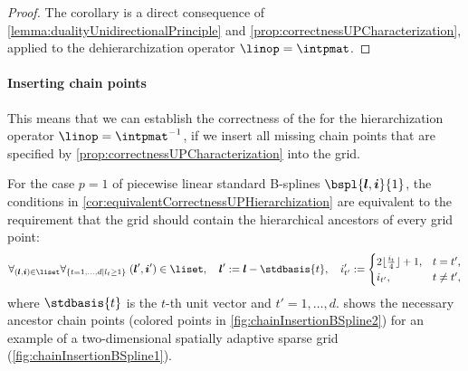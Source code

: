 \begin{proof}
  The corollary is a direct consequence of
  \cref{lemma:dualityUnidirectionalPrinciple} and
  \cref{prop:correctnessUPCharacterization},
  applied to the dehierarchization operator $\linop = \intpmat$.
\end{proof}

\paragraph{Inserting chain points}

This means that we can establish the correctness of the \up
for the hierarchization operator $\linop = \intpmatinv$,
if we insert all missing chain points that are specified by
\cref{prop:correctnessUPCharacterization} into the grid.

For the case $p = 1$ of piecewise linear
standard B-splines $\bspl{\*l,\*i}{1}$, the conditions in
\cref{cor:equivalentCorrectnessUPHierarchization}
are equivalent to the requirement that the grid should contain
the hierarchical ancestors of every grid point:
\begin{equation}
\fafa{(\*l,\*i) \in \liset}{\{t = 1, \dotsc, d \mid l_t \ge 1\}}{
  (\*l',\*i') \in \liset
},\quad
\*l' := \*l - \stdbasis{t},\quad
i_{t'}' :=
\begin{cases}
2 \floor{\tfrac{i_t}{4}} + 1,&t = t',\\
i_{t'},&t \not= t',
\end{cases}
\end{equation}
where $\stdbasis{t}$ is the $t$-th unit vector and $t' = 1, \dotsc, d$.
 shows the necessary ancestor chain points
(colored points in \cref{fig:chainInsertionBSpline2})
for an example of a two-dimensional spatially adaptive sparse grid
(\cref{fig:chainInsertionBSpline1}).

